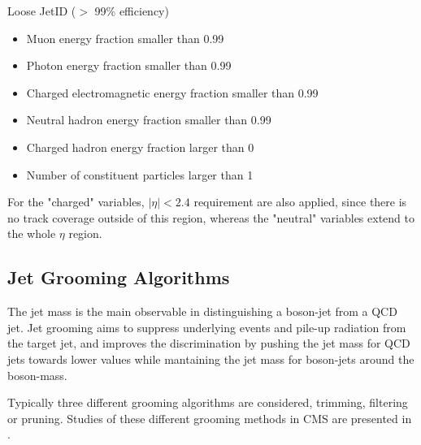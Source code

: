 Loose JetID ($>$ 99\% efficiency)
\begin{itemize}
\item Muon energy fraction smaller than 0.99
\item Photon energy fraction smaller than 0.99
\item Charged electromagnetic energy fraction smaller than 0.99
\item Neutral hadron energy fraction smaller than 0.99
\item Charged hadron energy fraction larger than 0
\item Number of constituent particles larger than 1
\end{itemize}

For the "charged" variables, $|\eta| < 2.4$ requirement are also applied, since there is no track coverage outside of this region, whereas the "neutral" variables extend to the whole $\eta$ region.

\subsection{Jet Grooming Algorithms}

The jet mass is the main observable in distinguishing a boson-jet from a QCD jet. Jet grooming aims to suppress underlying events and pile-up radiation from the target jet, and improves the discrimination by pushing the jet mass for QCD jets towards lower values while mantaining the jet mass for boson-jets around the boson-mass\cite{AN-12-137,AN-13-072}.

Typically three different grooming algorithms are considered, trimming\cite{JetTrim}, filtering\cite{JetFilter} or pruning\cite{JetPruned,JetPruned2}. Studies of these different grooming methods in CMS are presented in \cite{GroomCMS}.

